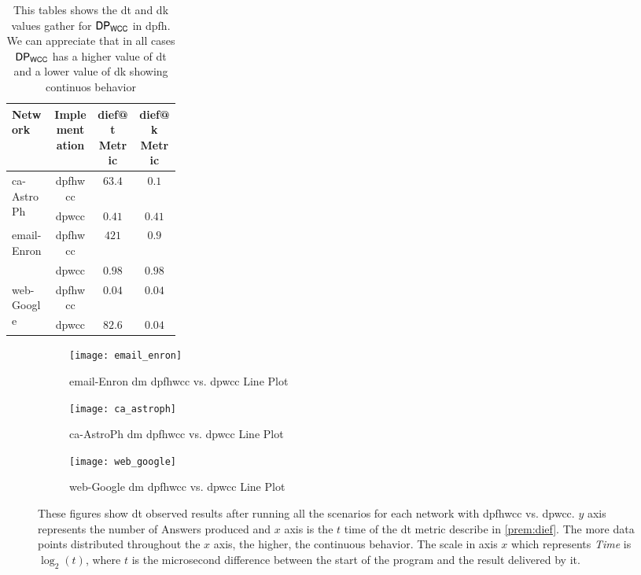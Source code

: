 \begin{table}[htp!]
  \centering
  \begin{tabular}{|p{0.25\linewidth}|c|c|c|}
    \hline
   \textbf{Network} & \textbf{Implementation} & \textbf{dief@t Metric}  & \textbf{dief@k Metric}\\
   \hline
   \multirow{2}{*}{ca-AstroPh} & \acrshort{dpfhwcc} & $63.4$ & $0.1$\\
   & \acrshort{dpwcc} & $0.41$ & $0.41$\\
   \hline
   \multirow{2}{*}{email-Enron} & \acrshort{dpfhwcc} & $421$ & $0.9$\\
   & \acrshort{dpwcc} & $0.98$ & $0.98$\\
   \hline
   \multirow{2}{*}{web-Google} & \acrshort{dpfhwcc} & $0.04$ & $0.04$ \\
   & \acrshort{dpwcc} & $82.6$ & $0.04$\\
  \hline
  \end{tabular}
  \caption{This tables shows the \acrshort{dt} and \acrshort{dk} values gather for  $\mathsf{DP_{WCC}}$ in \acrshort{dpfh}. We can appreciate that in all cases $\mathsf{DP_{WCC}}$ has a higher value of \acrshort{dt} and a lower value of \acrshort{dk} showing continuos behavior}
 \label{table:e1:dm:values}
 \end{table}

\begin{figure}[!htp]
  \centering
  \begin{subfigure}[t]{0.3\textwidth}
   \texttt{[image: email\_enron]}
   \caption{email-Enron \acrlong{dm} \acrshort{dpfhwcc} vs. \acrshort{dpwcc} Line Plot}
    \label{fig:dief:new:1}
  \end{subfigure}\hfill
  \begin{subfigure}[t]{0.3\textwidth}
   \texttt{[image: ca\_astroph]}
   \caption{ca-AstroPh \acrlong{dm} \acrshort{dpfhwcc} vs. \acrshort{dpwcc} Line Plot}
    \label{fig:dief:new:2}
  \end{subfigure}\hfill
  \begin{subfigure}[t]{0.3\textwidth}
   \texttt{[image: web\_google]}
   \caption{web-Google \acrlong{dm} \acrshort{dpfhwcc} vs. \acrshort{dpwcc} Line Plot}
    \label{fig:dief:new:3}
  \end{subfigure}\hfill
   \caption{These figures show \acrshort{dt} observed results after running all the scenarios for each network with \acrshort{dpfhwcc} vs. \acrshort{dpwcc}. $y$ axis represents the number of Answers produced and $x$ axis is the $t$ time of the \acrshort{dt} metric describe in \autoref{prem:dief}. The more data points distributed throughout the $x$ axis, the higher, the continuous behavior. The scale in axis $x$ which represents \textit{Time} is $\log_{2}(t)$, where $t$ is the microsecond difference between the start of the program and the result delivered by it.}
   \label{fig:dief:all}
 \end{figure}


